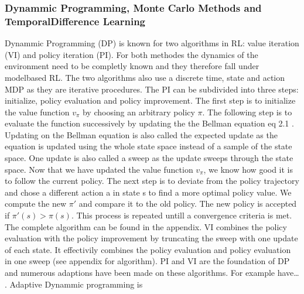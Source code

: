 \documentclass[letterpaper,10pt,english]{jupyterBook}
\begin{document}
\subsubsection{Dynammic Programming, Monte Carlo Methods and Temporal\sphinxhyphen{}Difference Learning}
\label{\detokenize{Reinforcement_learning:dynammic-programming-monte-carlo-methods-and-temporal-difference-learning}}
\sphinxAtStartPar
Dynammic Programming (DP) is known for two algorithms in RL: value iteration (VI) and policy iteration (PI). For both methodes the dynamics of the environment need to be completly known and they therefore fall under model\sphinxhyphen{}based RL. The two algorithms also use a discrete time, state and action MDP as they are iterative procedures. The PI can be subdivided into three steps: initialize, policy evaluation and policy improvement. The first step is to initialize the value function \(v_{\pi}\) by choosing an arbitrary policy \(\pi\). The following step is to evaluate the function successively by updating the the Bellman equation eq 2.1 . Updating on the Bellman equation is also called the expected update as the equation is updated using the whole state space instead of a sample of the state space. One update is also called a sweep as the update sweeps through the state space. Now that we have updated the value function \(v_{\pi}\), we know how good it is to follow the current policy. The next step is to deviate from the policy trajectory and chose a different action a in state s to find a more optimal policy value. We compute the new \(\pi '\) and compare it to the old policy. The new policy is accepted if \(\pi '(s) > \pi(s)\). This process is repeated untill a convergence criteria is met. The complete algorithm can be found in the appendix. VI combines the policy evaluation with the policy improvement by truncating the sweep with one update of each state. It effectivily combines the policy evaluation and policy evaluation in one sweep (see appendix for algorithm). PI and VI are the foundation of DP and numerous adaptions have been made on these algorithms. For example have… . Adaptive Dynammic programming is
\end{document}
